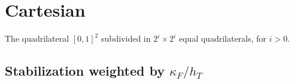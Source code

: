 \documentclass[10pt]{article}
\begin{document}
  \begin{figure}[ht]
    \centering
      \scalebox{0.7}{}%
      \scalebox{0.7}{}
      \scalebox{0.7}{}%
      \scalebox{0.7}{}
      \scalebox{0.7}{}%
      \scalebox{0.7}{}
  \end{figure}

  \begin{figure}[ht]
    \centering
      \scalebox{0.7}{}%
      \scalebox{0.7}{}
      \scalebox{0.7}{}%
      \scalebox{0.7}{}
      \scalebox{0.7}{}%
      \scalebox{0.7}{}
  \end{figure}
\FloatBarrier
\section{Cartesian}
    The quadrilateral $[0,1]^2$ subdivided in $2^i \times 2^i$ equal quadrilaterals, for $i > 0$.

\subsection{Stabilization weighted by $\kappa_F/h_T$}
  \begin{figure}[ht]
    \centering
      \scalebox{0.7}{}%
      \scalebox{0.7}{}
      \scalebox{0.7}{}%
      \scalebox{0.7}{}
  \end{figure}

  \begin{figure}[ht]
    \centering
      \scalebox{0.7}{}%
      \scalebox{0.7}{}
      \scalebox{0.7}{}%
      \scalebox{0.7}{}
      \scalebox{0.7}{}%
      \scalebox{0.7}{}
  \end{figure}
\end{document}
